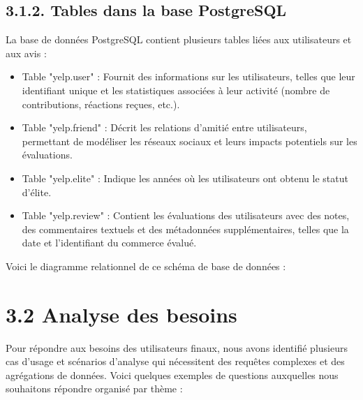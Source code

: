 \subsection*{3.1.2. Tables dans la base PostgreSQL}
La base de données PostgreSQL contient plusieurs tables liées aux utilisateurs et aux avis :

\begin{itemize}
\item Table "yelp.user" : Fournit des informations sur les utilisateurs, telles que leur identifiant unique et les statistiques associées à leur activité (nombre de contributions, réactions reçues, etc.).


\item Table "yelp.friend" : Décrit les relations d’amitié entre utilisateurs, permettant de modéliser les réseaux sociaux et leurs impacts potentiels sur les évaluations.


\item Table "yelp.elite" : Indique les années où les utilisateurs ont obtenu le statut d’élite.


\item Table "yelp.review" : Contient les évaluations des utilisateurs avec des notes, des commentaires textuels et des métadonnées supplémentaires, telles que la date et l’identifiant du commerce évalué.


\end{itemize}

Voici le diagramme relationnel de ce schéma de base de données :

\section*{3.2 Analyse des besoins}

Pour répondre aux besoins des utilisateurs finaux, nous avons identifié plusieurs cas d’usage et scénarios d’analyse qui nécessitent des requêtes complexes et des agrégations de données.
Voici quelques exemples de questions auxquelles nous souhaitons répondre organisé par thème :

